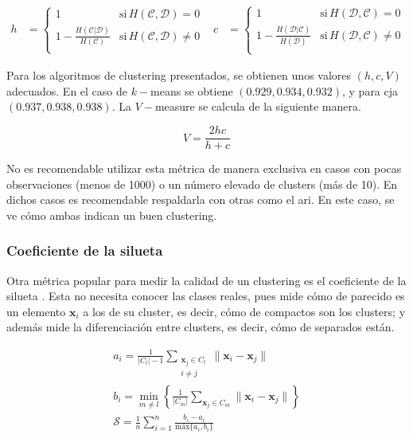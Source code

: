 					$$
					\begin{aligned}
						h &= \begin{cases}
							1 & \text{si}\, H(\mathscr{C}, \mathscr{D}) = 0\\
							1 - \frac{H(\mathscr{C}|\mathscr{D})}{H(\mathscr{C})} & \text{si}\, H(\mathscr{C}, \mathscr{D}) \neq 0\\
						\end{cases} & 
						c &= \begin{cases}
							1 & \text{si}\, H(\mathscr{D}, \mathscr{C}) = 0\\
							1 - \frac{H(\mathscr{D}|\mathscr{C})}{H(\mathscr{D})} & \text{si}\, H(\mathscr{D}, \mathscr{C}) \neq 0\\
						\end{cases}
					\end{aligned}
					$$
					
					Para los algoritmos de clustering presentados, se obtienen unos valores $(h, c, V)$ adecuados. En el caso de $k-$means se obtiene $(0.929, 0.934, 0.932)$, y para \gls{cja} $(0.937, 0.938, 0.938)$. La $V-$measure se calcula de la siguiente manera. 
					
					$$
					V = \frac{2hc}{h + c}
					$$
					
					No es recomendable utilizar esta métrica de manera exclusiva en casos con pocas observaciones (menos de 1000) o un número elevado de clusters (más de 10). En dichos casos es recomendable respaldarla con otras como el \gls{ari}. En este caso, se ve cómo ambas indican un buen clustering.
					
				\subsubsection{Coeficiente de la silueta}
				
					 Otra métrica popular para medir la calidad de un clustering es el coeficiente de la silueta \cite{formulas_silhouette}. Esta no necesita conocer las clases reales, pues mide cómo de parecido es un elemento $\textbf{x}_i$ a los de su cluster, es decir, cómo de compactos son los clusters; y además mide la diferenciación entre clusters, es decir, cómo de separados están. 
					 
					 $$
					 \begin{gathered}
					 	a_i = \frac{1}{|C_l| - 1}\sum_{\substack{\textbf{x}_j\in C_l\\ i\neq j}}\|\textbf{x}_i - \textbf{x}_j\|\\
					 	b_i = \min_{m \neq l}\left\lbrace\frac{1}{|C_m|}\sum_{\textbf{x}_j\in C_m}\|\textbf{x}_i - \textbf{x}_j\|\right\rbrace\\
					 	\mathcal{S} = \frac{1}{n}\sum_{i = 1}^{n}\frac{b_i - a_i}{\text{máx}\{a_i, b_i\}}
					 \end{gathered}
					 $$
					 
